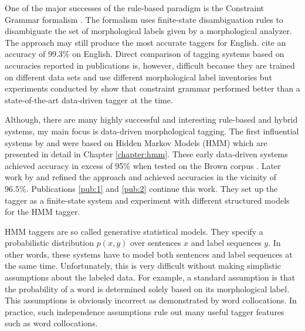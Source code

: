 One of the major successes of the rule-based paradigm is the
Constraint Grammar formalism \citep{Karlsson1995}. The formalism uses
finite-state disambiguation rules to disambiguate the set of
morphological labels given by a morphological analyzer. The approach
may still produce the most accurate taggers for English.
\cite{Voutilainen1995} cite an accuracy of 99.3\% on English. Direct
comparison of tagging systems based on accuracies reported in
publications is, however, difficult because they are trained on
different data sets and use different morphological label inventories
but experiments conducted by \cite{Samuelsson1997} show that
constraint grammar performed better than a state-of-the-art
data-driven tagger at the time.

Although, there are many highly successful and interesting rule-based
and hybrid systems, my main focus is data-driven morphological
tagging. The first influential systems by \cite{Church1988} and
\cite{DeRose1988} were based on Hidden Markov Models (HMM) which are
presented in detail in Chapter \ref{chapter:hmm}. These early
data-driven systems achieved accuracy in excess of 95\% when tested on
the Brown corpus \citep{Francis1964}. Later work by \cite{Brants2000}
and \cite{Halacsy2007} refined the approach and achieved accuracies in
the vicinity of $96.5\%$. Publications \ref{pub:1} and
\ref{pub:2} continue this work. They set up the tagger as a
finite-state system and experiment with different structured models
for the HMM tagger.

HMM taggers are so called generative statistical models. They specify
a probabilistic distribution $p(x,y)$ over sentences $x$ and label
sequences $y$. In other words, these systems have to model both
sentences and label sequences at the same time. Unfortunately, this is
very difficult without making simplistic assumptions about the labeled
data. For example, a standard assumption is that the probability of a
word is determined solely based on its morphological label. This
assumptions is obviously incorrect as demonstrated by word
collocations. In practice, such independence assumptions rule out many
useful tagger features such as word collocations.

